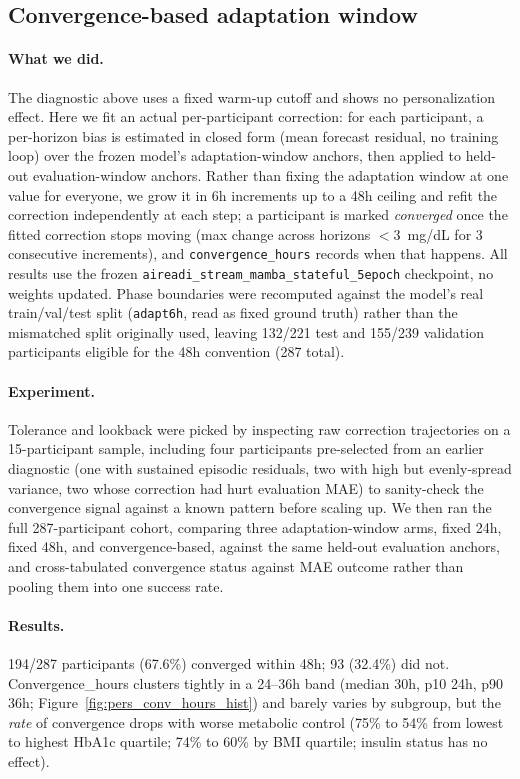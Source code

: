 \subsection{Convergence-based adaptation window}
\label{subsec:pers_convergence}

\paragraph{What we did.} The diagnostic above uses a fixed warm-up cutoff and shows no personalization effect. Here we fit an actual per-participant correction: for each participant, a per-horizon bias is estimated in closed form (mean forecast residual, no training loop) over the frozen model's adaptation-window anchors, then applied to held-out evaluation-window anchors. Rather than fixing the adaptation window at one value for everyone, we grow it in 6h increments up to a 48h ceiling and refit the correction independently at each step; a participant is marked \emph{converged} once the fitted correction stops moving (max change across horizons $<3$~mg/dL for 3 consecutive increments), and \texttt{convergence\_hours} records when that happens. All results use the frozen \texttt{aireadi\_stream\_mamba\_stateful\_5epoch} checkpoint, no weights updated. Phase boundaries were recomputed against the model's real train/val/test split (\texttt{adapt6h}, read as fixed ground truth) rather than the mismatched split originally used, leaving 132/221 test and 155/239 validation participants eligible for the 48h convention (287 total).

\paragraph{Experiment.} Tolerance and lookback were picked by inspecting raw correction trajectories on a 15-participant sample, including four participants pre-selected from an earlier diagnostic (one with sustained episodic residuals, two with high but evenly-spread variance, two whose correction had hurt evaluation MAE) to sanity-check the convergence signal against a known pattern before scaling up. We then ran the full 287-participant cohort, comparing three adaptation-window arms, fixed 24h, fixed 48h, and convergence-based, against the same held-out evaluation anchors, and cross-tabulated convergence status against MAE outcome rather than pooling them into one success rate.

\paragraph{Results.} 194/287 participants (67.6\%) converged within 48h; 93 (32.4\%) did not. Convergence\_hours clusters tightly in a 24--36h band (median 30h, p10 24h, p90 36h; Figure~\ref{fig:pers_conv_hours_hist}) and barely varies by subgroup, but the \emph{rate} of convergence drops with worse metabolic control (75\% to 54\% from lowest to highest HbA1c quartile; 74\% to 60\% by BMI quartile; insulin status has no effect).

